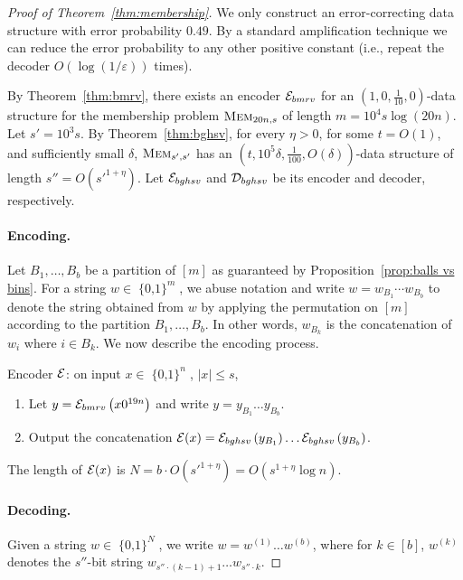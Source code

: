 \documentclass[11pt,english]{article}
\theoremstyle{definition}
\theoremstyle{remark}
\newcommand{\eps}{\varepsilon}
\newcommand{\D}{{\cal D}}
\newcommand{\E}{{\cal E}}
\newcommand{\cube}{\operatorname{\{0, 1\}}}
\newcommand{\mem}{\mbox{\textsc{Mem}}}
\begin{document}
\begin{proof}[Proof of Theorem~\ref{thm:membership}]We only construct
an error-correcting data structure with error probability $0.49$.
By a standard amplification technique 
we can reduce the error probability to any other positive constant (i.e., repeat the decoder $O(\log(1/\eps))$ times).

By Theorem~\ref{thm:bmrv}, there exists an encoder $\E_{bmrv}$
for an $(1,0,\frac{1}{10},0)$-data structure for the membership problem
$\mem_{20n,s}$ of length $m=10^{4}s\log(20n)$. Let $s'=10^{3}s$.
By Theorem~\ref{thm:bghsv}, for every $\eta>0$, for some $t=O(1)$,
and sufficiently small $\delta$, $\mem_{s',s'}$ has an $(t,10^{5}\delta,\frac{1}{100},O(\delta))$-data structure of length $s''=O(s'^{1+\eta})$. Let $\E_{bghsv}$
and $\D_{bghsv}$ be its encoder and decoder, respectively.


\paragraph{\textbf{Encoding.}}

Let $B_{1},\ldots,B_{b}$ be a partition of $[m]$ as guaranteed by
Proposition~\ref{prop:balls vs bins}. For a string $w\in\cube^{m}$,
we abuse notation and write $w=w_{B_{1}}\cdots w_{B_{b}}$ to denote
the string obtained from $w$ by applying the permutation on $[m]$
according to the partition $B_{1},\ldots,B_{b}$. In other words,
$w_{B_{k}}$ is the concatenation of $w_{i}$ where $i\in B_{k}$.
We now describe the encoding process.

Encoder $\E$: on input $x\in\cube^{n}$, $|x|\leq s$, 
\begin{enumerate}
\item Let $y=\E_{bmrv}\left(x0^{19n}\right)$ and write $y=y_{B_{1}}\ldots y_{B_{b}}$. 
\item Output the concatenation $\E(x)=\E_{bghsv}\left(y_{B_{1}}\right)\ldots\E_{bghsv}\left(y_{B_{b}}\right)$. 
\end{enumerate}
The length of $\E(x)$ is $N=b\cdot O(s'^{1+\eta})=O(s^{1+\eta}\log n)$.

\paragraph{\textbf{Decoding.}}

Given a string $w\in\cube^{N}$, we write $w=w^{(1)}\ldots w^{(b)}$,
where for $k\in[b]$, $w^{(k)}$ denotes the $s''$-bit string $w_{s''\cdot(k-1)+1}\ldots w_{s''\cdot k}$.


\end{proof}
\end{document}
